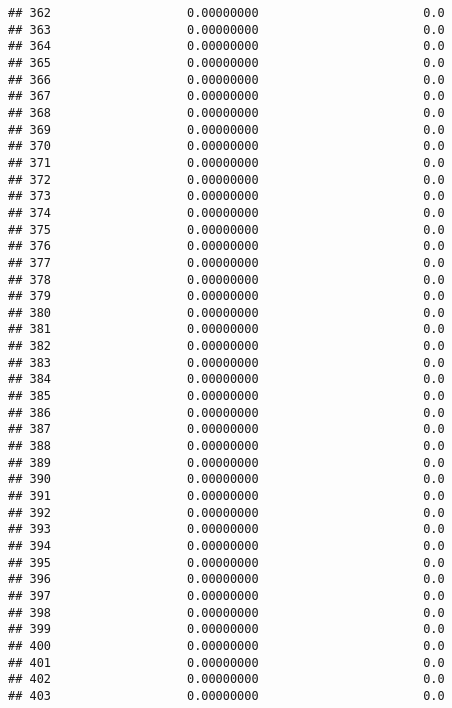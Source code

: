 \documentclass[]{article}
\begin{document}
\begin{verbatim}
## 362                   0.00000000                       0.0
## 363                   0.00000000                       0.0
## 364                   0.00000000                       0.0
## 365                   0.00000000                       0.0
## 366                   0.00000000                       0.0
## 367                   0.00000000                       0.0
## 368                   0.00000000                       0.0
## 369                   0.00000000                       0.0
## 370                   0.00000000                       0.0
## 371                   0.00000000                       0.0
## 372                   0.00000000                       0.0
## 373                   0.00000000                       0.0
## 374                   0.00000000                       0.0
## 375                   0.00000000                       0.0
## 376                   0.00000000                       0.0
## 377                   0.00000000                       0.0
## 378                   0.00000000                       0.0
## 379                   0.00000000                       0.0
## 380                   0.00000000                       0.0
## 381                   0.00000000                       0.0
## 382                   0.00000000                       0.0
## 383                   0.00000000                       0.0
## 384                   0.00000000                       0.0
## 385                   0.00000000                       0.0
## 386                   0.00000000                       0.0
## 387                   0.00000000                       0.0
## 388                   0.00000000                       0.0
## 389                   0.00000000                       0.0
## 390                   0.00000000                       0.0
## 391                   0.00000000                       0.0
## 392                   0.00000000                       0.0
## 393                   0.00000000                       0.0
## 394                   0.00000000                       0.0
## 395                   0.00000000                       0.0
## 396                   0.00000000                       0.0
## 397                   0.00000000                       0.0
## 398                   0.00000000                       0.0
## 399                   0.00000000                       0.0
## 400                   0.00000000                       0.0
## 401                   0.00000000                       0.0
## 402                   0.00000000                       0.0
## 403                   0.00000000                       0.0

\end{verbatim}
\end{document}
